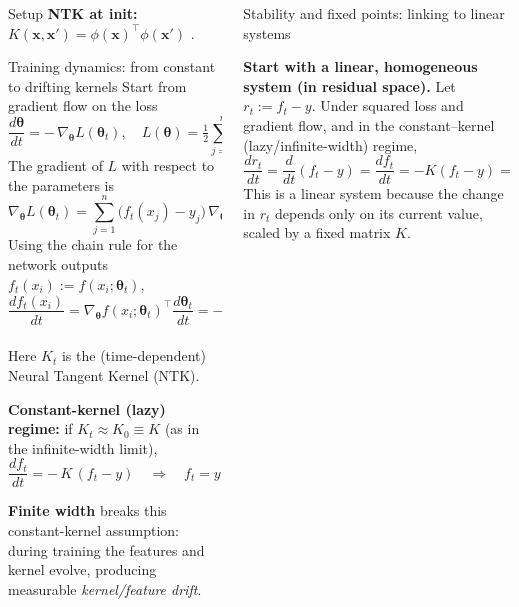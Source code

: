 \documentclass[final,12pt]{beamer}
\newcommand{\btheta}{\boldsymbol{\theta}}
\newcommand{\bx}{\boldsymbol{x}}
\begin{document}
\begin{frame}[t]
\begin{columns}[t,totalwidth=\textwidth]
\begin{column}{.32\textwidth}
\begin{block}{Setup}
				\textbf{NTK at init:}\; $K(\bx,\bx')=\phi(\bx)^{\top}\phi(\bx')$ \citep{jacot2018ntk}.
			\end{block}

			\begin{block}{Training dynamics: from constant to drifting kernels}
				Start from gradient flow on the loss
				\[
					\frac{d\btheta}{dt} = -\,\nabla_{\btheta} L(\btheta_t),
					\quad
					L(\btheta)=\tfrac12\sum_{j=1}^n\big(f(x_j;\btheta)-y_j\big)^2.
				\]
				The gradient of $L$ with respect to the parameters is
				\[
					\nabla_{\btheta} L(\btheta_t)
					= \sum_{j=1}^n \big(f_t(x_j)-y_j\big)\,
					\nabla_{\btheta} f(x_j;\btheta_t).
				\]
				Using the chain rule for the network outputs
				\( f_t(x_i) := f(x_i;\btheta_t) \),
				\[
					\frac{d f_t(x_i)}{dt}
					= \nabla_{\btheta} f(x_i;\btheta_t)^{\!\top}
					\frac{d\btheta_t}{dt}
					= -\sum_{j=1}^n
					\underbrace{\nabla_{\btheta} f(x_i;\btheta_t)^{\!\top}
						\nabla_{\btheta} f(x_j;\btheta_t)}_{K_t(x_i,x_j)}
					\big(f_t(x_j)-y_j\big).
				\]
				Here $K_t$ is the (time-dependent) Neural Tangent Kernel (NTK).

				\medskip
				\textbf{Constant-kernel (lazy) regime:}
				if $K_t \approx K_0 \equiv K$ (as in the infinite-width limit),
				\[
					\frac{d f_t}{dt} = -\,K\,(f_t - y)
					\quad\Rightarrow\quad
					f_t = y + e^{-Kt}(f_0 - y).
				\]

				\textbf{Finite width} breaks this constant-kernel assumption:
				during training the features and kernel evolve,
				producing measurable \emph{kernel/feature drift}.
			\end{block}
		\end{column}

		\begin{column}{.36\textwidth}
			\begin{block}{Stability and fixed points: linking to linear systems}

				\textbf{Start with a linear, homogeneous system (in residual space).}
				Let \(r_t := f_t - y\). Under squared loss and gradient flow, and in the constant–kernel (lazy/infinite-width) regime,
				\[
					\frac{dr_t}{dt} = \frac{d}{dt}(f_t - y) = \frac{df_t}{dt} = -K(f_t - y) = -K\,r_t
					\quad\Longrightarrow\quad
					r_t = e^{-Kt}\,r_0.
				\]
				This is a linear system because the change in \(r_t\) depends only on its current value, scaled by a fixed matrix \(K\).


\end{block}
\end{column}
\end{columns}
\end{frame}
\end{document}
